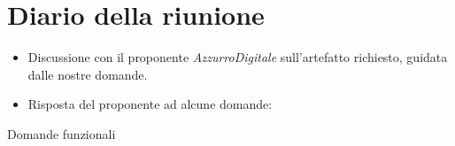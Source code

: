 \section{Diario della riunione}

\begin{itemize}
    \item Discussione con il proponente \emph{AzzurroDigitale} sull'artefatto richiesto, guidata dalle nostre domande.
    \item Risposta del proponente ad alcune domande:
\end{itemize}

\vspace{0.5cm}

\begingroup
\renewcommand{\ni}{\noindent}

  {\Large Domande funzionali}

  \vspace{0.5cm}

